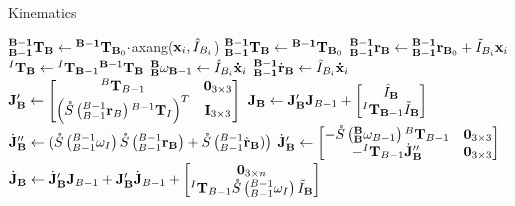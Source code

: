 \begin{algorithm}[H]
	\caption{Kinematics}\label{alg:kinematics}
	\begin{algorithmic}
		\State ${\BL}\T_\B \gets {^\mathbf{B-1}}\T_{\B_0}\cdot$axang($\x_i , \IHat_{B_i}$)
		\Else
		\State ${\BL}\T_\B \gets {^\mathbf{B-1}}\T_{\B_0}$
		\EndIf
		\State $\BL\r_\B \gets {\BL}\r_{\B_0} + \ITilde_{B_i}\x_i$
		\State $^I\T_\B \gets {^I\T_{\B-1}}{^{\B-1}}\T_\B$
		\State $\BB\omega_{\B -1 } \gets \IHat_{B_i} \dotx_i$
		\State $\BL\dotr_{\B} \gets \ITilde_{B_i} \dotx_i$
		\State $\J_\B' \gets  \begin{bmatrix}
		{^B\T_{B - 1}}                                       & \ZERO_{3 \times 3} \\
		\left (\S{^{B-1}_{B-1}\r_B}{^{B-1}\T_{I}} \right )^T & \EYE_{3 \times 3}  
		\end{bmatrix}$
		\State $\J_\B \gets \J_\B' \J_{B-1} + \begin{bmatrix} 
		{\IHat_\B} \\
		{{^I\T_{\B-1}}\ITilde_\B}
		\end{bmatrix}$
		\State $\dotJ_\B'' \gets (\S{^{B-1}_{B-1}\omega_I}\S{^{B-1}_{B-1}\r_\B}+\S{^{B-1}_{B-1}\dotr_\B)}$
		\State $\dotJ_\B' \gets \begin{bmatrix}  
		-\S{\BB\omega_{B-1}}{^B\T_{B-1}}                                       & \ZERO_{3 \times 3} \\
		-{^I\T_{B-1}}
		\dotJ_\B'' & \ZERO_{3 \times 3} \\
		\end{bmatrix}$
		\State $\dotJ_\B \gets \dotJ_\B' \J_{B-1} + \J_\B' \dotJ_{B-1} + \begin{bmatrix} 
		\ZERO_{3 \times n} \\
		{{^I{\T}_{B-1}}\S{^{B-1}_{B-1}\omega_I}\ITilde_\B} \\
		\end{bmatrix}$
	\end{algorithmic}
\end{algorithm}

